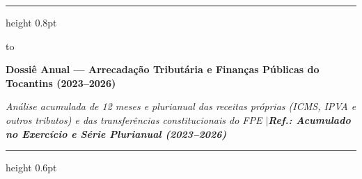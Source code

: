 \documentclass[10pt,a4paper]{article}
\begin{document}
\color{cinzatexto}

%
\par\vspace{2pt}%
{\color{coracento}\hrule height 0.8pt}%
\par\vspace{6pt}%
\noindent\hbox to %
\par\vspace{5pt}%
{\fontsize{14.5}{17.4}\selectfont\bfseries\color{corprimaria}Dossiê Anual — Arrecadação Tributária e Finanças Públicas do Tocantins (2023–2026)\par}%
\vspace{3pt}%
{\footnotesize\itshape\color{cinzasub}Análise acumulada de 12 meses e plurianual das receitas próprias (ICMS, IPVA e outros tributos) e das transferências constitucionais do FPE \enspace$\vert$\enspace \textbf{\color{corprimaria}Ref.: Acumulado no Exercício e Série Plurianual (2023–2026)}\par}%
\par\vspace{6pt}%
{\color{cinzaborda}\hrule height 0.6pt}%

\vspace{0.12cm}
\end{document}
